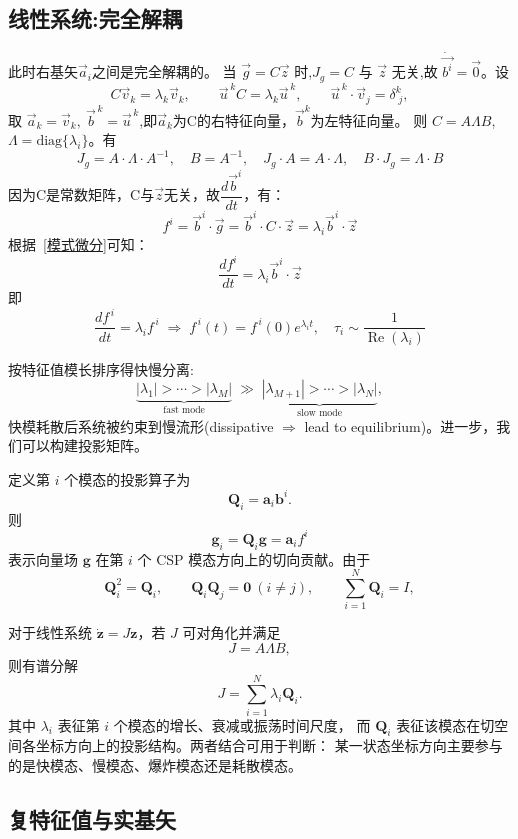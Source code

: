 \documentclass[11pt,a4paper]{article}
\newcommand{\Jg}{J_{\!g}}
\newcommand{\diff}[2]{\dfrac{d #1}{d #2}}
\DeclareMathOperator{\Real}{Re}
\begin{document}
\subsection{线性系统:完全解耦}
此时右基矢$\vec a_i$之间是完全解耦的。
当 $\vec g=C\vec z$ 时,$\Jg=C$ 与 $\vec z$ 无关,故 $\dot{\overrightarrow{b^i}}=\vec 0$。设
\begin{equation}
C\vec v_k=\lambda_k\vec v_k,\qquad \vec u^{\,k}C=\lambda_k\vec u^{\,k},\qquad
\vec u^{\,k}\cdot\vec v_j=\delta^{k}_{\;j},
\end{equation}
取 $\vec a_k=\vec v_k,\ \vec b^{\,k}=\vec u^{\,k}$,即$\vec a_k$为C的右特征向量，$\vec b^k$为左特征向量。
则 $C=A\Lambda B$,$\Lambda=\mathrm{diag}\{\lambda_i\}$。有
\[
\Jg=A\cdot \Lambda\cdot A^{-1} ,\quad B=A^{-1},\quad \Jg\cdot A=A\cdot \Lambda,\quad B\cdot \Jg=\Lambda \cdot B
\]
因为C是常数矩阵，C与$\vec z$无关，故$\diff{\vec b^i}{t}$，有：
\begin{equation}
	f^i=\vec b^i\cdot \vec g=\vec b^i\cdot C \cdot \vec z=\lambda_i\vec b^i\cdot \vec z
\end{equation}
根据~\eqref{模式微分}可知：
\[\diff{f^i}{t}=\lambda_i\vec b^i\cdot \vec z
\]
即
\begin{equation}
\boxed{\;
\diff{f^{\,i}}{t}=\lambda_i f^{\,i}\;\Longrightarrow\;f^{\,i}(t)=f^{\,i}(0)e^{\lambda_i t},\quad
\tau_i\sim\frac{1}{\Real(\lambda_i)}\;}
\end{equation}

按特征值模长排序得快慢分离:
\begin{equation}
\underbrace{|\lambda_1|>\cdots>|\lambda_M|}_{\text{fast mode}}\;\gg\;
\underbrace{|\lambda_{M+1}|>\cdots>|\lambda_N|}_{\text{slow mode}},
\end{equation}
快模耗散后系统被约束到慢流形(dissipative $\Rightarrow$ lead to equilibrium)。进一步，我们可以构建投影矩阵。

定义第 \(i\) 个模态的投影算子为
\[
\bm Q_i=\bm a_i\bm b^i .
\]
则
\[
\bm g_i=\bm Q_i\bm g=\bm a_i f^i
\]
表示向量场 \(\bm g\) 在第 \(i\) 个 CSP 模态方向上的切向贡献。由于
\[
\bm Q_i^2=\bm Q_i,\qquad
\bm Q_i\bm Q_j=\bm 0\ (i\neq j),\qquad
\sum_{i=1}^{N}\bm Q_i=I ,
\]

对于线性系统 \(\dot{\bm z}=J\bm z\)，若 \(J\) 可对角化并满足
\[
J=A\Lambda B,
\]
则有谱分解
\[
J=\sum_{i=1}^{N}\lambda_i\bm Q_i .
\]
其中 \(\lambda_i\) 表征第 \(i\) 个模态的增长、衰减或振荡时间尺度，
而 \(\bm Q_i\) 表征该模态在切空间各坐标方向上的投影结构。两者结合可用于判断：
某一状态坐标方向主要参与的是快模态、慢模态、爆炸模态还是耗散模态。

\subsection{复特征值与实基矢}
\end{document}
